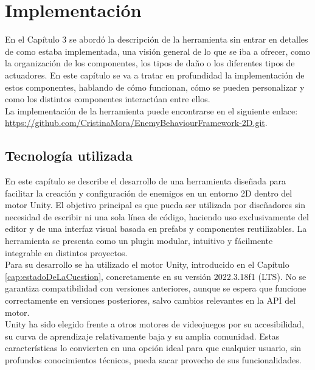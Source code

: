 \setcounter{secnumdepth}{3} %
\chapter{Implementaci\'on}
\label{cap:implementacion}


En el Capítulo 3 se abordó la descripción de la herramienta sin entrar en detalles de como estaba implementada, una visión general de lo que se iba a ofrecer, como la organización de los componentes, los tipos de daño o los diferentes tipos de actuadores. En este capítulo se va a tratar en profundidad la implementación de estos componentes, hablando de cómo funcionan, cómo se pueden personalizar y como los distintos componentes interactúan entre ellos.\\

La implementación de la herramienta puede encontrarse en el siguiente enlace: \href{https://github.com/CristinaMora/EnemyBehaviourFramework-2D.git}{https://github.com/CristinaMora/EnemyBehaviourFramework-2D.git}.

\section{Tecnología utilizada}
En este capítulo se describe el desarrollo de una herramienta diseñada para facilitar la creación y configuración de enemigos en un entorno 2D dentro del motor Unity. El objetivo principal es que pueda ser utilizada por diseñadores sin necesidad de escribir ni una sola línea de código, haciendo uso exclusivamente del editor y de una interfaz visual basada en prefabs y componentes reutilizables. La herramienta se presenta como un plugin modular, intuitivo y fácilmente integrable en distintos proyectos.\\

Para su desarrollo se ha utilizado el motor Unity, introducido en el Capítulo \ref{cap:estadoDeLaCuestion}, concretamente en su versión 2022.3.18f1 (LTS). No se garantiza compatibilidad con versiones anteriores, aunque se espera que funcione correctamente en versiones posteriores, salvo cambios relevantes en la API del motor.\\

Unity ha sido elegido frente a otros motores de videojuegos por su accesibilidad, su curva de aprendizaje relativamente baja y su amplia comunidad. Estas características lo convierten en una opción ideal para que cualquier usuario, sin profundos conocimientos técnicos, pueda sacar provecho de sus funcionalidades.\\

